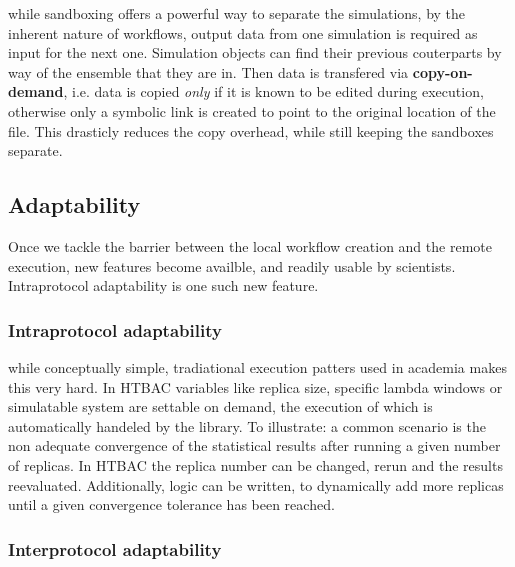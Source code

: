 while sandboxing offers a powerful way to separate the simulations, by the inherent nature of workflows, output data from one simulation is required as input for the next one. Simulation objects can find their previous couterparts by way of the ensemble that they are in. Then data is transfered via \textbf{copy-on-demand}, i.e. data is copied \emph{only} if it is known to be edited during execution, otherwise only a symbolic link is created to point to the original location of the file. This drasticly reduces the copy overhead, while still keeping the sandboxes separate.

\subsection{Adaptability}

Once we tackle the barrier between the local workflow creation and the remote execution, new features become availble, and readily usable by scientists. Intraprotocol adaptability is one such new feature.

\subsubsection{Intraprotocol adaptability}

while conceptually simple, tradiational execution patters used in academia makes this very hard. In HTBAC variables like replica size, specific lambda windows or simulatable system are settable on demand, the execution of which is automatically handeled by the library. To illustrate: a common scenario is the non adequate convergence of the statistical results after running a given number of replicas. In HTBAC the replica number can be changed, rerun and the results reevaluated. Additionally, logic can be written, to dynamically add more replicas until a given convergence tolerance has been reached.

\subsubsection{Interprotocol adaptability}
